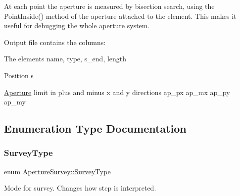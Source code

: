 At each point the aperture is measured by bisection search, using the Point\+Inside() method of the aperture attached to the element. This makes it useful for debugging the whole aperture system.

Output file contains the columns\+:

The element\textquotesingle{}s name, type, s\+\_\+end, length

Position s

\hyperlink{classAperture}{Aperture} limit in plus and minus x and y directions ap\+\_\+px ap\+\_\+mx ap\+\_\+py ap\+\_\+my 

\subsection{Enumeration Type Documentation}
\mbox{\label{namespaceApertureSurvey_a8824104e7e9b8cb1dd046f47a386bf87}} 
\subsubsection{\texorpdfstring{Survey\+Type}{SurveyType}}
{\footnotesize\ttfamily enum \hyperlink{namespaceApertureSurvey_a8824104e7e9b8cb1dd046f47a386bf87}{Aperture\+Survey\+::\+Survey\+Type}}



Mode for survey. Changes how step is interpreted. 

